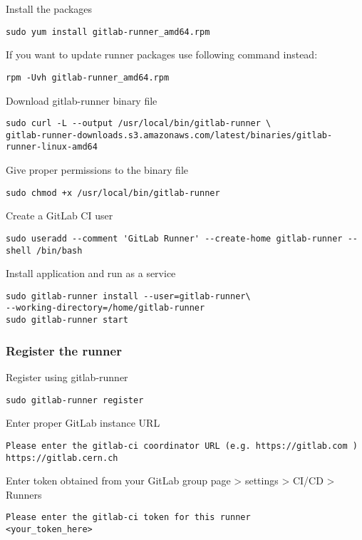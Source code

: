 Install the packages
\begin{lstlisting}
sudo yum install gitlab-runner_amd64.rpm
\end{lstlisting}

If you want to update runner packages use following command instead:
\begin{lstlisting}
rpm -Uvh gitlab-runner_amd64.rpm
\end{lstlisting}

Download gitlab-runner binary file
\begin{lstlisting}
sudo curl -L --output /usr/local/bin/gitlab-runner \
gitlab-runner-downloads.s3.amazonaws.com/latest/binaries/gitlab-runner-linux-amd64
\end{lstlisting}

Give proper permissions to the binary file
\begin{lstlisting}
sudo chmod +x /usr/local/bin/gitlab-runner
\end{lstlisting}

Create a GitLab CI user
\begin{lstlisting}
sudo useradd --comment 'GitLab Runner' --create-home gitlab-runner --shell /bin/bash
\end{lstlisting}

Install application and run as a service
\begin{lstlisting}
sudo gitlab-runner install --user=gitlab-runner\
--working-directory=/home/gitlab-runner
sudo gitlab-runner start
\end{lstlisting}

\subsubsection*{Register the runner}

Register using gitlab-runner
\begin{lstlisting}
sudo gitlab-runner register
\end{lstlisting}

Enter proper GitLab instance URL
\begin{lstlisting}
Please enter the gitlab-ci coordinator URL (e.g. https://gitlab.com )
https://gitlab.cern.ch
\end{lstlisting}

Enter token obtained from your GitLab group page > settings > CI/CD > Runners
\begin{lstlisting}
Please enter the gitlab-ci token for this runner
<your_token_here>
\end{lstlisting}

